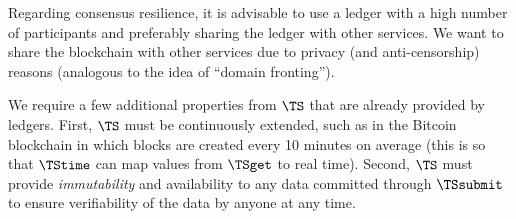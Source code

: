 Regarding consensus resilience, it is advisable to use a ledger with a high 
number of participants and preferably sharing the ledger with other services.
We want to share the blockchain with other services due to privacy (and 
anti-censorship) reasons (analogous to the idea of \enquote{domain fronting}).

We require a few additional properties from \(\TS\) that are already provided 
by ledgers.
First, \(\TS\) must be continuously extended, such as in the Bitcoin blockchain in which 
blocks are created every 10 minutes on average (this is so that \(\TStime\) can 
map values from \(\TSget\) to real time).
Second, \(\TS\) must provide \emph{immutability} and availability to any data 
committed through \(\TSsubmit\) to ensure verifiability of the data by anyone 
at any time.


